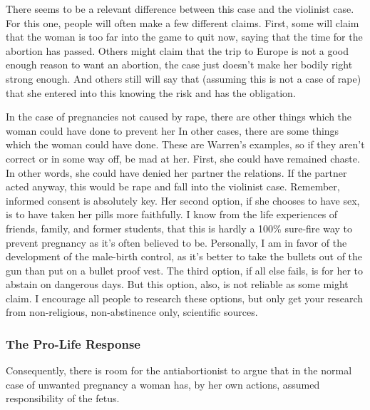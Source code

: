 There seems to be a relevant difference between this case and the violinist case. For this one, people will often make a few different claims. First, some will claim that the woman is too far into the game to quit now, saying that the time for the abortion has passed. Others might claim that the trip to Europe is not a good enough reason to want an abortion, the case just doesn't make her bodily right strong enough. And others still will say that (assuming this is not a case of rape) that she entered into this knowing the risk and has the obligation.

In the case of pregnancies not caused by rape, there are other things which the woman could have done to prevent her In other cases, there are some things which the woman could have done. These are Warren's examples, so if they aren't correct or in some way off, be mad at her.  First, she could have remained chaste. In other words, she could have denied her partner the relations. If the partner acted anyway, this would be rape and fall into the violinist case. Remember, informed consent is absolutely key. Her second option, if she chooses to have sex, is to have taken her pills more faithfully. I know from the life experiences of friends, family, and former students, that this is hardly a 100\% sure-fire way to prevent pregnancy as it's often believed to be.  Personally, I am in favor of the development of the male-birth control, as it's better to take the bullets out of the gun than put on a bullet proof vest. The third option, if all else fails, is for her to abstain on dangerous days. But this option, also, is not reliable as some might claim. I encourage all people to research these options, but only get your research from non-religious, non-abstinence only, scientific sources.  

\subsubsection{The Pro-Life Response}

Consequently, there is room for the antiabortionist to argue that in the normal case of unwanted pregnancy a woman has, by her own actions, assumed responsibility of the fetus.


